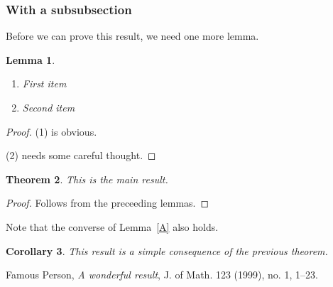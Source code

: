 \documentclass{amsart} %
\newtheorem{theorem}{Theorem} %
\newtheorem{lemma}[theorem]{Lemma}
\newtheorem{corollary}[theorem]{Corollary}
\begin{document}
\subsubsection{With a subsubsection}
Before we can prove this result, we need one
more lemma.

\begin{lemma}\label{B}
\begin{enumerate}
\renewcommand{\theenumi}{\roman{enumi}} %
  \item First item
  \item Second item
\end{enumerate}
\end{lemma}

\begin{proof}
(1) is obvious.

(2) needs some careful thought.
\end{proof}

\begin{theorem}\label{C} This is the main result.
\end{theorem}
\begin{proof}
Follows from the preceeding lemmas.
\end{proof}
Note that the converse of Lemma~\ref{A} also holds.

\begin{corollary}
This result is a simple consequence of the previous theorem.
\end{corollary}

\begin{thebibliography}{}
 Famous Person,
\emph{A wonderful result}, 
J. of Math. 123 (1999), no. 1, 1--23. 
\end{thebibliography}
\end{document}
